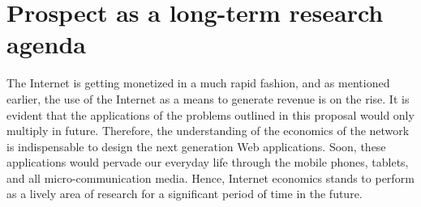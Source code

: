 \documentclass[10pt,psfig,letter]{article}
\begin{document}

\section{Prospect as a long-term research agenda}

The Internet is getting monetized in a much rapid fashion, and as mentioned earlier, the use of the Internet as a means to generate revenue is on the rise. It is evident that the applications of the problems outlined in this proposal would only multiply in future. Therefore, the understanding of the economics of the network is indispensable to design the next generation Web applications. Soon, these applications would pervade our everyday life through the mobile phones, tablets, and all micro-communication media. Hence, Internet economics stands to perform as a lively area of research for a significant period of time in the future.


\small

 

\end{document}
